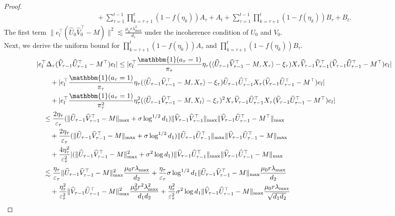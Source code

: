 \documentclass[12pt]{article}
\newcommand{\inp}[2]{\langle #1,#2\rangle}
\theoremstyle{plain}
\begin{document}
\begin{proof}
\begin{align*}
    &\quad \quad + \sum_{\tau=1}^{t-1}\prod_{k=\tau+1}^{t} (1-f(\eta_k))A_{\tau} + A_t + \sum_{\tau=1}^{t-1}\prod_{k=\tau+1}^{t} (1-f(\eta_k))B_{\tau} + B_t. 
\end{align*}
The first term $\|e_l^{\top}(\widehat{U}_{0}\widehat{V}_0^{\top}-M)\|^2\lesssim \frac{\mu_0r\lambda_{\max}^2}{d_1}$ under the incoherence condition of $U_0$ and $V_0$. \\
Next, we derive the uniform bound for $\prod_{k=\tau+1}^{t} (1-f(\eta_k))A_{\tau} $ and $\prod_{k=\tau+1}^{t} (1-f(\eta_k))B_{\tau}$. 
\begin{align*}
    &|e_l^{\top}\Delta_{\tau}(\widehat{V}_{\tau-1}\widehat{U}_{\tau-1}^{\top}-M^{\top})e_l|\leq |e_l^{\top} \frac{\mathbbm{1}(a_{\tau}=1)}{\pi_{\tau}}\eta_{\tau}(\inp{\widehat{U}_{\tau-1}\widehat{V}_{\tau-1}^{\top} - M}{X_{\tau}}-\xi_{\tau})X_{\tau}\widehat{V}_{\tau-1}\widehat{V}_{\tau-1}^{\top} (\widehat{V}_{\tau-1}\widehat{U}_{\tau-1}^{\top}-M^{\top})e_l| \\ &\quad\quad + |e_l^{\top} \frac{\mathbbm{1}(a_{\tau}=1)}{\pi_{\tau}}\eta_{\tau}(\inp{\widehat{U}_{\tau-1}\widehat{V}_{\tau-1}^{\top}- M}{X_{\tau}}-\xi_{\tau})\widehat{U}_{\tau-1}\widehat{U}_{\tau-1}^{\top}X_{\tau} (\widehat{V}_{\tau-1}\widehat{U}_{\tau-1}^{\top}-M^{\top})e_l| \\ &\quad\quad + |e_l^{\top} \frac{\mathbbm{1}(a_{\tau}=1)}{\pi_{\tau}^2}\eta_{\tau}^2(\inp{\widehat{U}_{\tau-1}\widehat{V}_{\tau-1}^{\top}- M}{X_t}-\xi_{\tau})^2X_{\tau}\widehat{V}_{\tau-1}\widehat{U}_{\tau-1}^{\top}X_{\tau} (\widehat{V}_{\tau-1}\widehat{U}_{\tau-1}^{\top}-M^{\top})e_l| \\
    &\quad\leq \frac{2\eta_{\tau}}{\varepsilon_{\tau}}(\|\widehat{U}_{\tau-1}\widehat{V}_{\tau-1}^{\top} - M\|_{\max}+\sigma\log^{1/2} d_1)\|\widehat{V}_{\tau-1}\widehat{V}_{\tau-1}^{\top}\|_{\max} \|\widehat{V}_{\tau-1}\widehat{U}_{\tau-1}^{\top}-M^{\top}\|_{\max} \\ &\quad\quad + \frac{2\eta_{\tau}}{\varepsilon_{\tau}}(\|\widehat{U}_{\tau-1}\widehat{V}_{\tau-1}^{\top} - M\|_{\max}+\sigma\log^{1/2} d_1)\|\widehat{U}_{\tau-1}\widehat{U}_{\tau-1}^{\top}\|_{\max} \|\widehat{V}_{\tau-1}\widehat{U}_{\tau-1}^{\top}-M\|_{\max} \\ &\quad\quad + \frac{4\eta_{\tau}^2}{\varepsilon_{\tau}^2}|(\|\widehat{U}_{\tau-1}\widehat{V}_{\tau-1}^{\top} - M\|_{\max}^2+\sigma^2\log d_1)\|\widehat{V}_{\tau-1}\widehat{U}_{\tau-1}^{\top}\|_{\max} \|\widehat{V}_{\tau-1}\widehat{U}_{\tau-1}^{\top}-M\|_{\max} \\
    &\quad\lesssim \frac{\eta_{\tau}}{\varepsilon_{\tau}}\|\widehat{U}_{\tau-1}\widehat{V}_{\tau-1}^{\top} - M\|_{\max}^2\frac{\mu_0r\lambda_{\max}}{d_2} +\frac{\eta_{\tau}}{\varepsilon_{\tau}}\sigma\log^{1/2} d_1\|\widehat{U}_{\tau-1}\widehat{V}_{\tau-1}^{\top} - M\|_{\max}\frac{\mu_0r\lambda_{\max}}{d_2} \\ &\quad\quad + \frac{\eta_{\tau}^2}{\varepsilon_{\tau}^2}\|\widehat{V}_{\tau-1}\widehat{U}_{\tau-1}^{\top}-M\|_{\max}^2\frac{\mu_0^2r^2\lambda_{\max}^2}{d_1d_2}  + \frac{\eta_{\tau}^2}{\varepsilon_{\tau}^2}\sigma^2\log d_1\|\widehat{V}_{\tau-1}\widehat{U}_{\tau-1}^{\top}-M\|_{\max}\frac{\mu_0r\lambda_{\max}}{\sqrt{d_1d_2}} \\

\end{align*}
\end{proof}
\end{document}
